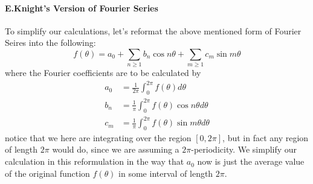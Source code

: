 \documentclass[11pt]{article}
\begin{document}
\paragraph{E.Knight's Version of Fourier Series} To simplify our 
calculations, let's reformat the above mentioned form
of Fourier Seires into the following:
\begin{equation*}
    f(\theta) = a_0 + \sum_{n\geq 1}b_n\cos n\theta + \sum_{m \geq 1}c_m\sin m \theta
\end{equation*}
where the Fourier coefficients are to be calculated by
\begin{align*}
    a_0 &= \frac{1}{2\pi}\int_{0}^{2\pi}f(\theta)d\theta \\
    b_n &= \frac{1}{\pi}\int_{0}^{2\pi}f(\theta)\cos n\theta d\theta \\
    c_m &= \frac{1}{\pi}\int_{0}^{2\pi}f(\theta)\sin m\theta d\theta 
\end{align*}
notice that we here are integrating over the region $[0, 2\pi]$, but in fact
any region of length $2\pi$ would do, since we are assuming a $2\pi$-periodicity.
We simplify our calculation in this reformulation in the way that $a_0$ now is
just the average value of the original function $f(\theta)$ in some interval
of length $2\pi$.
\end{document}
